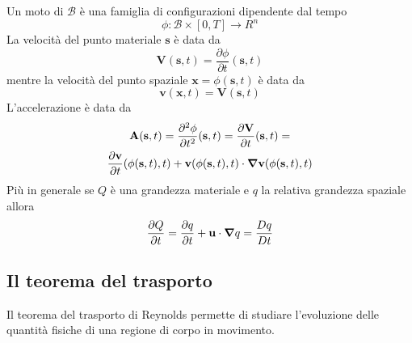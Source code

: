 Un moto di $\mathcal{B}$ è una famiglia di configurazioni dipendente dal tempo
\begin{equation*}
\phi: \mathcal{B} \times [0,T] \to R^{n}
\end{equation*}
La velocità del punto materiale $\mathbf{s}$ è data da
\begin{equation*}
\mathbf{V}(\mathbf{s},t) = \frac{\partial \phi}{\partial t}(\mathbf{s},t)
\end{equation*}
mentre la velocità del punto spaziale $\mathbf{x}=\phi(\mathbf{s},t)$ è data da
\begin{equation*}
\mathbf{v}(\mathbf{x},t) = \mathbf{V}(\mathbf{s},t)
\end{equation*}
L'accelerazione è data da
\begin{multline*}
\mathbf{A}(\mathbf{s},t) = \frac{\partial^2 \phi}{\partial t^2}(\mathbf{s},t) = \frac{\partial \mathbf{V}}{\partial t}(\mathbf{s},t) = \\ \frac{\partial \mathbf{v}}{\partial t}(\phi(\mathbf{s},t),t)+\mathbf{v}(\phi(\mathbf{s},t),t)\cdot\boldsymbol{\nabla}\mathbf{v}(\phi(\mathbf{s},t),t)
\end{multline*}
Più in generale se $Q$ è una grandezza materiale e $q$ la relativa grandezza spaziale allora
\begin{equation*}
\frac{\partial Q}{\partial t} = \frac{\partial q}{\partial t} + \mathbf{u}\cdot\boldsymbol{\nabla} q = \frac{Dq}{Dt}
\end{equation*}

\subsection{Il teorema del trasporto}

Il teorema del trasporto di Reynolds permette di studiare l'evoluzione delle quantità fisiche di una regione di corpo in movimento.

